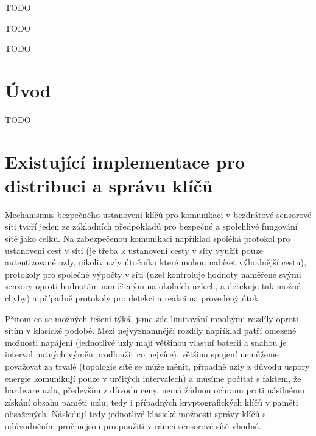 \documentclass[11pt,final,twoside]{fithesis2}
\begin{document}
\FrontMatter
\ThesisTitlePage

\begin{ThesisDeclaration}
  \DeclarationText
  \AdvisorName
\end{ThesisDeclaration}

\begin{ThesisThanks}
TODO
\end{ThesisThanks}

\begin{ThesisAbstract}
TODO
\end{ThesisAbstract}

\begin{ThesisKeyWords}
TODO
\end{ThesisKeyWords}

\MainMatter

\tableofcontents

\chapter{Úvod}


TODO

\chapter{Existující implementace pro distribuci a správu klíčů}
Mechanismus bezpečného ustanovení klíčů pro komunikaci v bezdrátové sensorové síti tvoří jeden ze základních předpokladů 
pro bezpečné a spolehlivé fungování sítě jako celku. Na zabezpečenou komunikaci například spoléhá protokol pro ustanovení cest v síti (je třeba k ustanovení cesty v síty využít
pouze autentizované uzly, nikoliv uzly útočníka které mohou nabízet výhodnější cestu), protokoly pro společné výpočty v síti (uzel kontroluje hodnoty naměřené svými senzory oproti
hodnotám naměřeným na okolních uzlech, a detekuje tak možné chyby) a případně protokoly pro detekci a reakci na provedený útok \cite{Alcaraz2012}.

Přitom co se možných řešení týká, jsme zde limitování mnohými rozdíly oproti sítím v klasické podobě. Mezi nejvýznamnější rozdíly například
patří omezené možnosti napájení (jednotlivé uzly mají většinou vlastní baterii a snahou je interval nutných výměn prodloužit co nejvíce), 
většinu spojení nemůžeme považovat za trvalé (topologie sítě se může měnit, případně uzly z důvodu úspory energie komunikují pouze v určitých 
intervalech) a musíme počítat s faktem, že hardware uzlu, především z důvodu ceny, nemá žádnou ochranu proti násilnému získání obsahu paměti uzlu, 
tedy i případných kryptografických klíčů v paměti obsažených. Následují tedy jednotlivé klasické možnosti správy klíčů s odůvodněním proč nejsou pro 
použití v rámci sensorové sítě vhodné.
\end{document}
